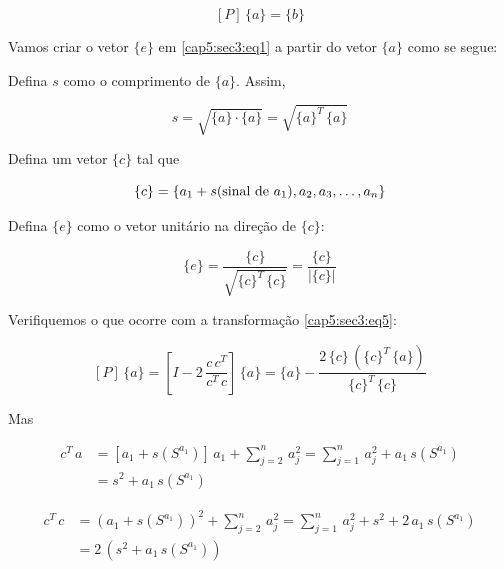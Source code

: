 \begin{equation}
\label{cap5:sec3:eq5}
 [P] \, \{a\} = \{b\}
\end{equation}

Vamos criar o vetor $ \{e\} $ em \ref{cap5:sec3:eq1} a partir do vetor $ \{a\} $ como se segue:

\begin{enumerar}

\item Defina $ s $ como o comprimento de $ \{a\} $. Assim,

\begin{equation}
 s = \sqrt{\{a\} \cdotp \{a\}} = \sqrt{\{a\}^T \, \{a\}}
\end{equation}

\item Defina um vetor $ \{c\} $ tal que

\begin{equation}
 \{c\} = \{a_1 + s \mbox{(sinal de $ a_1 $)} , a_2, a_3, \ldots, a_n\}
\end{equation}

\item Defina $ \{e\} $ como o vetor unitário na direção de $ \{c\} $:

\begin{equation}
 \{e\} = \frac{\{c\}}{\sqrt{\{c\}^T \, \{c\}}} = \frac{\{c\}}{|\{c\}|}
\end{equation}

\end{enumerar}

Verifiquemos o que ocorre com a transformação \ref{cap5:sec3:eq5}:

\begin{equation}
\label{cap5:sec3:eq9}
 [P] \, \{a\} = \left[ I - 2 \, \frac{c \, c^T}{c^T \, c} \right] \, \{a\} = \{a\} - \frac{2 \, \{c\} \, (\{c\}^T \, \{a\})}{\{c\}^T \, \{c\}}
\end{equation}

Mas

\begin{equation}
\label{cap5:sec3:eq10}
 \begin{array}{ll}
 c^T \, a & = [a_1 + s(S^{a_1})] \, a_1 + \sum_{j=2}^n \, a_j^2 = \sum_{j=1}^n \, a_j^2 + a_1 \, s(S^{a_1}) \\
          & = s^2 + a_1 \, s(S^{a_1})
 \end{array}
\end{equation}

\begin{equation}
\label{cap5:sec3:eq11}
 \begin{array}{ll}
 c^T \, c & = (a_1 + s(S^{a_1}))^2 + \sum_{j=2}^n \, a_j^2 = \sum_{j=1}^n \, a_j^2 + s^2 + 2 \, a_1 \, s(S^{a_1})\\
          & = 2 \, (s^2 + a_1 \, s(S^{a_1}))
 \end{array}
\end{equation}

